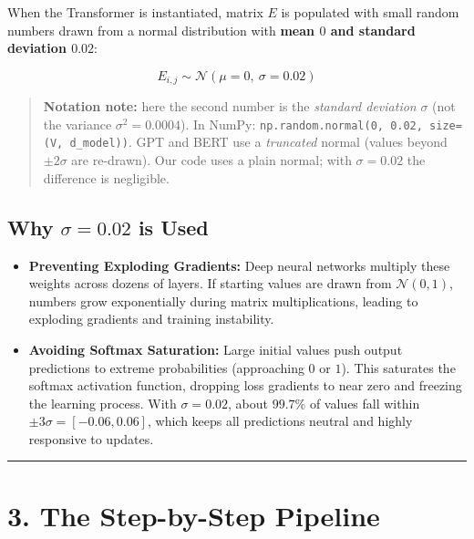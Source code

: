 \documentclass[11pt,a4paper,oneside]{report}
\providecommand{\tightlist}{\setlength{\itemsep}{0pt}\setlength{\parskip}{0pt}}
\begin{document}
When the Transformer is instantiated, matrix \(E\) is populated with small random numbers drawn from a normal distribution with \textbf{mean \(0\) and standard deviation \(0.02\)}:

\[E_{i, j} \sim \mathcal{N}(\mu = 0,\ \sigma = 0.02)\]

\begin{quote}
\textbf{Notation note:} here the second number is the \emph{standard deviation} \(\sigma\) (not the variance \(\sigma^2 = 0.0004\)). In NumPy: \texttt{np.\allowbreak{}random.\allowbreak{}normal(0,\ 0.02,\ size=(V,\ d\_\allowbreak{}model))}.
GPT and BERT use a \emph{truncated} normal (values beyond \(\pm 2\sigma\) are re-drawn). Our code uses a plain normal; with \(\sigma = 0.02\) the difference is negligible.
\end{quote}

\subsection{\texorpdfstring{Why \(\sigma = 0.02\) is Used}{Why \textbackslash sigma = 0.02 is Used}}\label{why-sigma--002-is-used}

\begin{itemize}
\tightlist
\item
  \textbf{Preventing Exploding Gradients:} Deep neural networks multiply these weights across dozens of layers. If starting values are drawn from \(\mathcal{N}(0, 1)\), numbers grow exponentially during matrix multiplications, leading to exploding gradients and training instability.
\item
  \textbf{Avoiding Softmax Saturation:} Large initial values push output predictions to extreme probabilities (approaching \(0\) or \(1\)). This saturates the softmax activation function, dropping loss gradients to near zero and freezing the learning process. With \(\sigma = 0.02\), about \(99.7\%\) of values fall within \(\pm 3\sigma = [-0.06, 0.06]\), which keeps all predictions neutral and highly responsive to updates.
\end{itemize}

\begin{center}\rule{0.5\linewidth}{0.5pt}\end{center}

\section{3. The Step-by-Step Pipeline}\label{3-the-step-by-step-pipeline}
\end{document}
